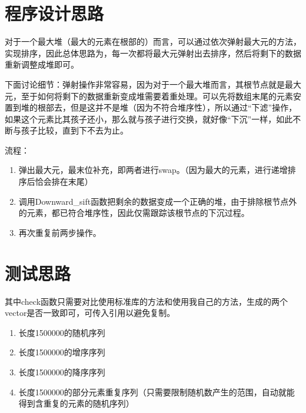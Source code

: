 \documentclass[UTF8]{ctexart}
\begin{document}
\pagestyle{fancy}
\fancyhead{}

\section{程序设计思路}



对于一个最大堆（最大的元素在根部的）而言，可以通过依次弹射最大元的方法，实现排序，因此总体思路为，每一次都将最大元弹射出去排序，然后将剩下的数据重新调整成堆即可。

下面讨论细节：弹射操作非常容易，因为对于一个最大堆而言，其根节点就是最大元，至于如何将剩下的数据重新变成堆需要着重处理。可以先将数组末尾的元素安置到堆的根部去，但是这并不是堆（因为不符合堆序性），所以通过“下滤”操作，如果这个元素比其孩子还小，那么就与孩子进行交换，就好像“下沉”一样，如此不断与孩子比较，直到下不去为止。

流程：
\begin{enumerate}
  \item 弹出最大元，最末位补充，即两者进行swap。（因为最大的元素，进行递增排序后恰会排在末尾）

  \item 调用Downward\_sift函数把剩余的数据变成一个正确的堆，由于排除根节点外的元素，都已符合堆序性，因此仅需跟踪该根节点的下沉过程。

  \item 再次重复前两步操作。

\end{enumerate}


\section{测试思路}

其中check函数只需要对比使用标准库的方法和使用我自己的方法，生成的两个vector是否一致即可，可传入引用以避免复制。

\begin{enumerate}

  \item 长度1500000的随机序列
  \item 长度1500000的增序序列
  \item 长度1500000的降序序列
  \item 长度1500000的部分元素重复序列（只需要限制随机数产生的范围，自动就能得到含重复的元素的随机序列）

\end{enumerate}
\end{document}
